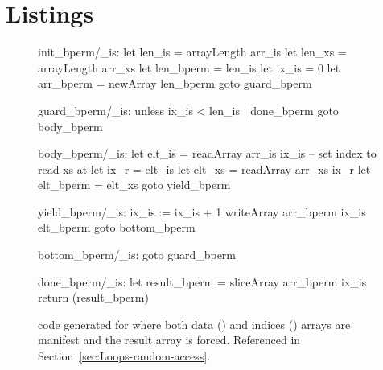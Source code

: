 \documentclass[preamble.tex]{subfiles}
\begin{document}
\clearpage

\chapter{Listings}
\label{ch:listings}

\begin{figure}[ht!]
\begin{loopcode}[%
    literate=
        {_xs}{{\sub{xs}}}2
        {_r}{{\sub{r}}}1
        {_is}{{\sub{is}}}2
        {_bperm}{{\sub{bperm}}}5
]
init_bperm/_is:
  let len_is = arrayLength arr_is
  let len_xs = arrayLength arr_xs
  let len_bperm = len_is
  let ix_is = 0
  let arr_bperm = newArray len_bperm
  goto guard_bperm

guard_bperm/_is:
  unless ix_is < len_is | done_bperm
  goto body_bperm

body_bperm/_is:
  let elt_is = readArray arr_is ix_is
  -- set index to read xs at
  let ix_r = elt_is
  let elt_xs = readArray arr_xs ix_r
  let elt_bperm = elt_xs
  goto yield_bperm

yield_bperm/_is:
  ix_is := ix_is + 1
  writeArray arr_bperm ix_is elt_bperm
  goto bottom_bperm

bottom_bperm/_is:
  goto guard_bperm

done_bperm/_is:
  let result_bperm = sliceArray arr_bperm ix_is
  return (result_bperm)
\end{loopcode}

\caption{\Loop code generated for  where both data () and indices () arrays are manifest and the result array is forced. Referenced in Section~\ref{sec:Loops-random-access}.}
\label{fig:Loop-bpermute-complete}
\end{figure}
\end{document}
